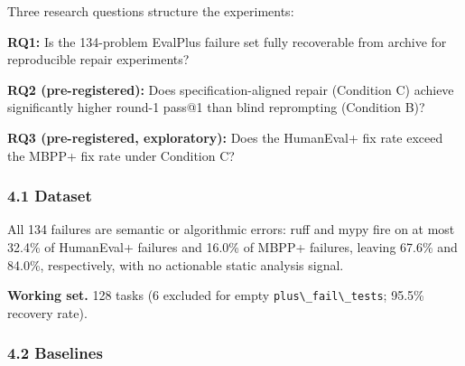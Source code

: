 
Three research questions structure the experiments:

\textbf{RQ1:} Is the 134-problem EvalPlus failure set fully recoverable from archive for reproducible repair experiments?

\textbf{RQ2 (pre-registered):} Does specification-aligned repair (Condition C) achieve significantly higher round-1 pass@1 than blind reprompting (Condition B)?

\textbf{RQ3 (pre-registered, exploratory):} Does the HumanEval+ fix rate exceed the MBPP+ fix rate under Condition C?

\subsubsection{4.1 Dataset}

\begin{table}[htbp]
\centering
{}
\end{table}

All 134 failures are semantic or algorithmic errors: ruff and mypy fire on at most 32.4\% of HumanEval+ failures and 16.0\% of MBPP+ failures, leaving 67.6\% and 84.0\%, respectively, with no actionable static analysis signal.

\textbf{Working set.} 128 tasks (6 excluded for empty \texttt{plus\textbackslash \_fail\textbackslash \_tests}; 95.5\% recovery rate).

\subsubsection{4.2 Baselines}

\begin{table}[htbp]
\centering
{}
\end{table}

